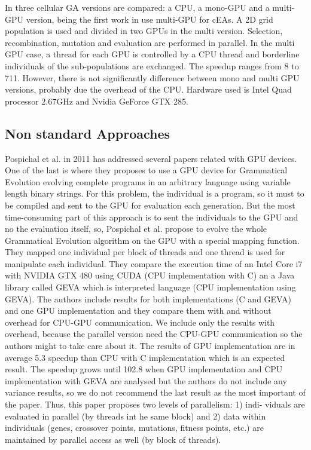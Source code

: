 \documentclass[prodmode,acmtecs]{acmsmall}
\begin{document}
In \cite{5586530} three cellular GA versions are compared: a CPU, a mono-GPU and a multi-GPU version, being the first work in use multi-GPU for cEAs. A 2D grid population is used and divided in two GPUs in the multi version. Selection, recombination, mutation and evaluation are performed in parallel. In the multi GPU case, a thread for each GPU is controlled by a CPU thread and borderline individuals of the sub-populations are exchanged. The
speedup ranges from 8 to 711. However, there is not significantly difference between mono and multi GPU versions, probably due the overhead of the CPU. Hardware used is Intel Quad processor 2.67GHz and Nvidia GeForce GTX 285. %


\subsection{Non standard Approaches}

Pospichal et al. in 2011 has addressed several papers related with GPU devices. One of the last is \cite{DBLP:conf/gecco/PospichalMOSJ11} where they proposes to use a GPU device for Grammatical Evolution evolving complete programs in an arbitrary language using variable length binary strings. For this problem, the individual is a program, so it must to be compiled and sent to the GPU for evaluation each generation. But the most time-consuming part of this approach is to sent the individuals to the GPU and no the evaluation itself, so, Pospichal et al. propose to evolve the whole Grammatical Evolution algorithm on the GPU with a special mapping function. They mapped one individual per block of threads and one thread is used for manipulate each individual. They compare the execution time of an Intel Core i7 with NVIDIA GTX 480 using CUDA (CPU implementation with C) an a Java library called GEVA \cite{O'Neill:2008:GGE:1527063.1527066} which is interpreted language (CPU implementation using GEVA).  The authors include results for both implementations (C and GEVA) and one GPU implementation and they compare them with and without overhead for CPU-GPU communication. We include only the results with overhead, because the parallel version need the CPU-GPU communication so the authors might to take care about it. The results of GPU implementation are in average 5.3 speedup than CPU with C implementation which is an expected result. The speedup grows until 102.8 when GPU implementation and CPU implementation with GEVA are analysed but the authors do not include any variance results, so we do not recommend the last result as the most important of the paper. Thus, this paper proposes two levels of parallelism: 1) indi-
viduals are evaluated in parallel (by threads int he same block) and 2) data within individuals (genes, crossover points, mutations, fitness points, etc.) are maintained by parallel access as well (by block of threads).
\end{document}
